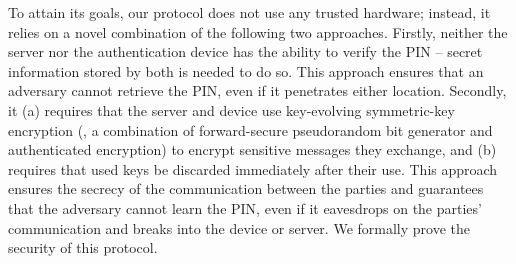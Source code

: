 To attain its goals, our protocol does not use any trusted hardware; instead, it relies on a novel combination of the following two approaches. Firstly, neither the server nor the authentication device has the ability to verify the PIN -- secret information stored by both is needed to do so. This approach ensures that an adversary cannot retrieve the PIN, even if it penetrates either location. 
Secondly, it  (a) requires that the server and device use key-evolving symmetric-key encryption (\ie, a combination of forward-secure pseudorandom bit generator and authenticated encryption) to encrypt sensitive messages they exchange,  and (b) requires that used keys be discarded immediately after their use.
This approach ensures the secrecy of the communication between the parties and guarantees that the adversary cannot learn the PIN, even if it eavesdrops on the parties' communication and breaks into the device or server. We formally prove the security of this protocol. 





%
%





% 





